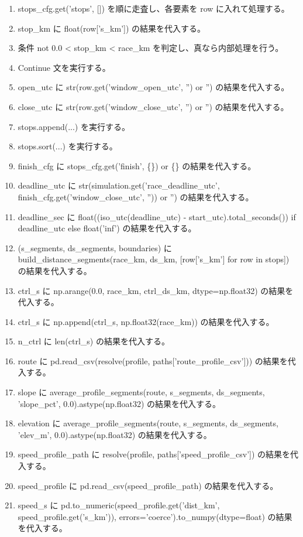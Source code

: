 \documentclass[a4paper,11pt]{article}
\begin{document}
\begin{enumerate}[leftmargin=1.8em]
\item stops\_cfg.get('stops', []) を順に走査し、各要素を row に入れて処理する。
\item   stop\_km に float(row['s\_km']) の結果を代入する。
\item   条件 not 0.0 < stop\_km < race\_km を判定し、真なら内部処理を行う。
\item     Continue 文を実行する。
\item   open\_utc に str(row.get('window\_open\_utc', '') or '') の結果を代入する。
\item   close\_utc に str(row.get('window\_close\_utc', '') or '') の結果を代入する。
\item   stops.append(...) を実行する。
\item stops.sort(...) を実行する。
\item finish\_cfg に stops\_cfg.get('finish', \{\}) or \{\} の結果を代入する。
\item deadline\_utc に str(simulation.get('race\_deadline\_utc', finish\_cfg.get('window\_close\_utc', '')) or '') の結果を代入する。
\item deadline\_sec に float((iso\_utc(deadline\_utc) - start\_utc).total\_seconds()) if deadline\_utc else float('inf') の結果を代入する。
\item (s\_segments, ds\_segments, boundaries) に build\_distance\_segments(race\_km, ds\_km, [row['s\_km'] for row in stops]) の結果を代入する。
\item ctrl\_s に np.arange(0.0, race\_km, ctrl\_ds\_km, dtype=np.float32) の結果を代入する。
\item ctrl\_s に np.append(ctrl\_s, np.float32(race\_km)) の結果を代入する。
\item n\_ctrl に len(ctrl\_s) の結果を代入する。
\item route に pd.read\_csv(resolve(profile, paths['route\_profile\_csv'])) の結果を代入する。
\item slope に average\_profile\_segments(route, s\_segments, ds\_segments, 'slope\_pct', 0.0).astype(np.float32) の結果を代入する。
\item elevation に average\_profile\_segments(route, s\_segments, ds\_segments, 'elev\_m', 0.0).astype(np.float32) の結果を代入する。
\item speed\_profile\_path に resolve(profile, paths['speed\_profile\_csv']) の結果を代入する。
\item speed\_profile に pd.read\_csv(speed\_profile\_path) の結果を代入する。
\item speed\_s に pd.to\_numeric(speed\_profile.get('dist\_km', speed\_profile.get('s\_km')), errors='coerce').to\_numpy(dtype=float) の結果を代入する。

\end{enumerate}
\end{document}
